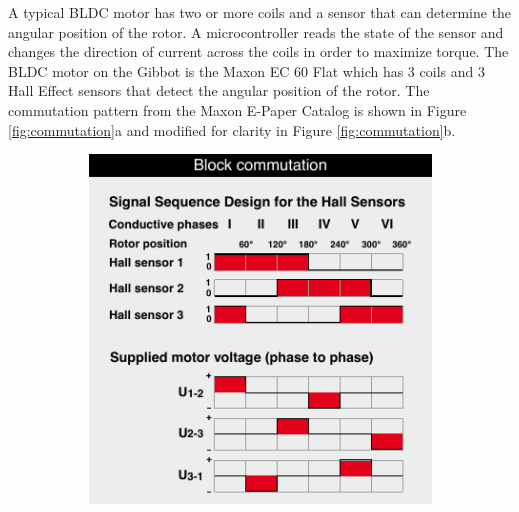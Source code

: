 \documentclass{article}
\begin{document}
A typical BLDC motor has two or more coils and a sensor that can determine the angular position of the rotor. A microcontroller reads the state of the sensor and changes the direction of current across the coils in order to maximize torque. The BLDC motor on the Gibbot is the Maxon EC 60 Flat which has 3 coils and 3 Hall Effect sensors that detect the angular position of the rotor. The commutation pattern from the Maxon E-Paper Catalog is shown in Figure \ref{fig:commutation}a and modified for clarity in Figure \ref{fig:commutation}b. 
\begin{figure}[h!]
	\centering
	\begin{subfigure}{0.4\textwidth}
		\includegraphics[width=\textwidth]{commutation}
		\caption{}
	\end{subfigure}
	\quad
	\begin{subfigure}{0.4\textwidth}

\end{subfigure}
\end{figure}
\end{document}

